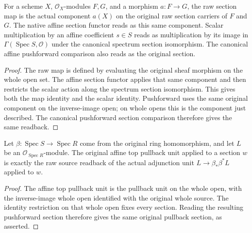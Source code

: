 \begin{lemma}
\label{lem:kn-canonical-affine-native-raw-map}
\leanok
For a scheme $X$, $\mathcal O_X$-modules $F,G$, and a morphism $a:F\to G$,
the raw section map is the actual component $a(X)$ on the original raw
section carriers of $F$ and $G$. The native affine section functor reads
as this same component. Scalar multiplication by an affine coefficient
$s\in S$ reads as multiplication by its image in
$\Gamma(\operatorname{Spec}S,\mathcal O)$ under the canonical spectrum
section isomorphism. The canonical affine pushforward comparison also
reads as the original section.
\end{lemma}
\begin{proof}
The raw map is defined by evaluating the original sheaf morphism on the
whole open set. The affine section functor applies that same component
and then restricts the scalar action along the spectrum section
isomorphism. This gives both the map identity and the scalar identity.
Pushforward uses the same original component on the inverse-image open;
on whole opens this is the component just described. The canonical
pushforward section comparison therefore gives the same readback.
\end{proof}

\begin{lemma}
\label{lem:kn-canonical-affine-native-unit-readback}
\leanok
Let $\beta:\operatorname{Spec}S\to\operatorname{Spec}R$ come from the
original ring homomorphism, and let $L$ be an
$\mathcal O_{\operatorname{Spec}R}$-module. The original affine top pullback
unit applied to a section $w$ is exactly the raw source readback of the
actual adjunction unit $L\to\beta_*\beta^*L$ applied to $w$.
\end{lemma}
\begin{proof}
The affine top pullback unit is the pullback unit on the whole open,
with the inverse-image whole open identified with the original whole
source. The identity restriction on that whole open fixes every
section. Reading the resulting pushforward section therefore gives the
same original pullback section, as asserted.
\end{proof}

